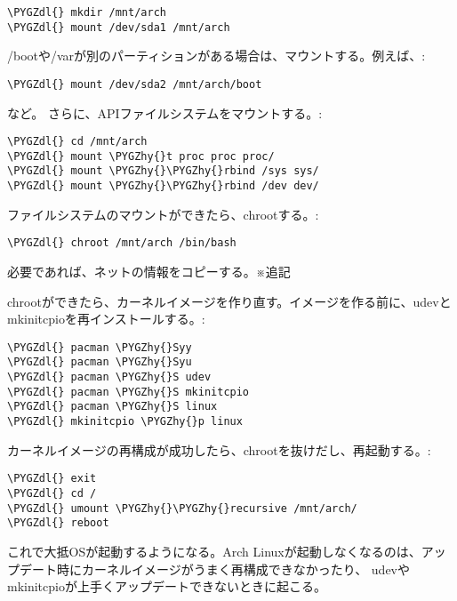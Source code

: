 \documentclass[letterpaper,10pt,dvipdfmx]{sphinxmanual}
\def\PYGZdl{\char`\$}
\def\PYGZhy{\char`\-}
\begin{document}
\begin{Verbatim}[commandchars=\\\{\}]
\PYGZdl{} mkdir /mnt/arch
\PYGZdl{} mount /dev/sda1 /mnt/arch
\end{Verbatim}

/bootや/varが別のパーティションがある場合は、マウントする。例えば、:

\begin{Verbatim}[commandchars=\\\{\}]
\PYGZdl{} mount /dev/sda2 /mnt/arch/boot
\end{Verbatim}

など。
さらに、APIファイルシステムをマウントする。:

\begin{Verbatim}[commandchars=\\\{\}]
\PYGZdl{} cd /mnt/arch
\PYGZdl{} mount \PYGZhy{}t proc proc proc/
\PYGZdl{} mount \PYGZhy{}\PYGZhy{}rbind /sys sys/
\PYGZdl{} mount \PYGZhy{}\PYGZhy{}rbind /dev dev/
\end{Verbatim}

ファイルシステムのマウントができたら、chrootする。:

\begin{Verbatim}[commandchars=\\\{\}]
\PYGZdl{} chroot /mnt/arch /bin/bash
\end{Verbatim}

必要であれば、ネットの情報をコピーする。※追記

chrootができたら、カーネルイメージを作り直す。イメージを作る前に、udevとmkinitcpioを再インストールする。:

\begin{Verbatim}[commandchars=\\\{\}]
\PYGZdl{} pacman \PYGZhy{}Syy
\PYGZdl{} pacman \PYGZhy{}Syu
\PYGZdl{} pacman \PYGZhy{}S udev
\PYGZdl{} pacman \PYGZhy{}S mkinitcpio
\PYGZdl{} pacman \PYGZhy{}S linux
\PYGZdl{} mkinitcpio \PYGZhy{}p linux
\end{Verbatim}

カーネルイメージの再構成が成功したら、chrootを抜けだし、再起動する。:

\begin{Verbatim}[commandchars=\\\{\}]
\PYGZdl{} exit
\PYGZdl{} cd /
\PYGZdl{} umount \PYGZhy{}\PYGZhy{}recursive /mnt/arch/
\PYGZdl{} reboot
\end{Verbatim}

これで大抵OSが起動するようになる。Arch Linuxが起動しなくなるのは、アップデート時にカーネルイメージがうまく再構成できなかったり、
udevやmkinitcpioが上手くアップデートできないときに起こる。
\end{document}
